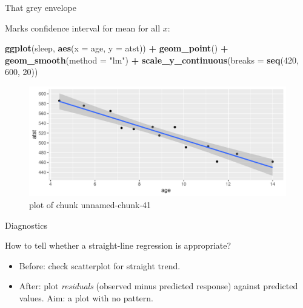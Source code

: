 \documentclass[ignorenonframetext,]{beamer}
\newenvironment{Shaded}{\begin{snugshade}}{\end{snugshade}}
\newcommand{\DataTypeTok}[1]{\textcolor[rgb]{0.13,0.29,0.53}{#1}}
\newcommand{\DecValTok}[1]{\textcolor[rgb]{0.00,0.00,0.81}{#1}}
\newcommand{\KeywordTok}[1]{\textcolor[rgb]{0.13,0.29,0.53}{\textbf{#1}}}
\newcommand{\NormalTok}[1]{#1}
\newcommand{\OperatorTok}[1]{\textcolor[rgb]{0.81,0.36,0.00}{\textbf{#1}}}
\newcommand{\StringTok}[1]{\textcolor[rgb]{0.31,0.60,0.02}{#1}}
\begin{document}
\begin{frame}[fragile]{That grey envelope}
\protect\hypertarget{that-grey-envelope}{}

Marks confidence interval for mean for all \(x\):

\begin{Shaded}
\begin{Highlighting}[]
\KeywordTok{ggplot}\NormalTok{(sleep, }\KeywordTok{aes}\NormalTok{(}\DataTypeTok{x =}\NormalTok{ age, }\DataTypeTok{y =}\NormalTok{ atst)) }\OperatorTok{+}\StringTok{ }\KeywordTok{geom_point}\NormalTok{() }\OperatorTok{+}
\StringTok{  }\KeywordTok{geom_smooth}\NormalTok{(}\DataTypeTok{method =} \StringTok{"lm"}\NormalTok{) }\OperatorTok{+}
\StringTok{  }\KeywordTok{scale_y_continuous}\NormalTok{(}\DataTypeTok{breaks =} \KeywordTok{seq}\NormalTok{(}\DecValTok{420}\NormalTok{, }\DecValTok{600}\NormalTok{, }\DecValTok{20}\NormalTok{))}
\end{Highlighting}
\end{Shaded}

\begin{figure}
\centering
\includegraphics{figure/unnamed-chunk-41-1.pdf}
\caption{plot of chunk unnamed-chunk-41}
\end{figure}

\end{frame}

\begin{frame}{Diagnostics}
\protect\hypertarget{diagnostics}{}

How to tell whether a straight-line regression is appropriate?

\vspace{3ex}

\begin{itemize}
\item
  Before: check scatterplot for straight trend.
\item
  After: plot \emph{residuals} (observed minus predicted response)
  against predicted values. Aim: a plot with no pattern.
\end{itemize}

\end{frame}
\end{document}

